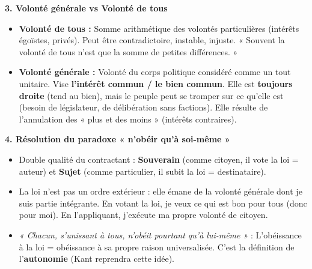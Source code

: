 \documentclass[11pt]{article}
\begin{document}
\begin{corrige}
\textbf{3. Volonté générale vs Volonté de tous}
\begin{itemize}
\item \textbf{Volonté de tous :} Somme arithmétique des volontés particulières (intérêts égoïstes, privés). Peut être contradictoire, instable, injuste. « Souvent la volonté de tous n'est que la somme de petites différences. »
\item \textbf{Volonté générale :} Volonté du corps politique considéré comme un tout unitaire. Vise \textbf{l'intérêt commun / le bien commun}. Elle est \textbf{toujours droite} (tend au bien), mais le peuple peut se tromper sur ce qu'elle est (besoin de législateur, de délibération sans factions). Elle résulte de l'annulation des « plus et des moins » (intérêts contraires).
\end{itemize}

\textbf{4. Résolution du paradoxe « n'obéir qu'à soi-même »}
\begin{itemize}
\item Double qualité du contractant : \textbf{Souverain} (comme citoyen, il vote la loi = auteur) et \textbf{Sujet} (comme particulier, il subit la loi = destinataire).
\item La loi n'est pas un ordre extérieur : elle émane de la volonté générale dont je suis partie intégrante. En votant la loi, je veux ce qui est bon pour tous (donc pour moi). En l'appliquant, j'exécute ma propre volonté de citoyen.
\item \emph{« Chacun, s'unissant à tous, n'obéit pourtant qu'à lui-même »} : L'obéissance à la loi = obéissance à sa propre raison universalisée. C'est la définition de l'\textbf{autonomie} (Kant reprendra cette idée).
\end{itemize}


\end{corrige}
\end{document}
